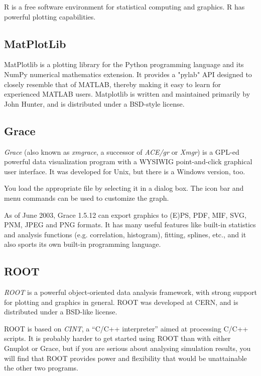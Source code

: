 R is a free software environment for statistical computing and graphics.
R has powerful plotting capabilities.

\subsection{MatPlotLib}

MatPlotlib is a plotting library for the Python programming language and
its NumPy numerical mathematics extension. It provides a "pylab" API designed
to closely resemble that of MATLAB, thereby making it easy to learn
for experienced MATLAB users. Matplotlib is written and maintained primarily
by John Hunter, and is distributed under a BSD-style license.

\subsection{Grace}

\textit{Grace} (also known as \textit{xmgrace}, a successor of \textit{ACE/gr} or
\textit{Xmgr}) is a GPL-ed powerful data visualization program
with a WYSIWIG point-and-click graphical user interface. It was developed for
Unix, but there is a Windows version, too.

You load the appropriate file by selecting it in a dialog box.
The icon bar and menu commands can be used to customize the graph.

As of June 2003, Grace 1.5.12 can export graphics to (E)PS, PDF, MIF, SVG,
PNM, JPEG and PNG formats. It has many useful features like built-in statistics
and analysis functions (e.g. correlation, histogram), fitting, splines, etc.,
and it also sports its own built-in programming language.


\subsection{ROOT}

\textit{ROOT} is a powerful object-oriented data analysis framework,
with strong support for plotting and graphics in general.
ROOT was developed at CERN, and is distributed under a BSD-like license.

ROOT is based on \textit{CINT}, a ``C/C++ interpreter''
aimed at processing C/C++ scripts. It is probably harder to get started
using ROOT than with either Gnuplot or Grace, but if you are serious
about analysing simulation results, you will find that ROOT provides
power and flexibility that would be unattainable the other two programs.

